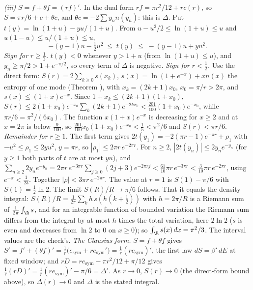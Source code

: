 \emph{(iii)} $S = f + \theta f = (rf)'$. In the dual form $rf = \pi r^{2}/12 + rc(r)$, so $S = \pi r/6 + c + \theta c$, and $\theta c = -2\sum y_{n}n(y_{n})$: this is $\Delta$. Put $t(y) = \ln(1 + u) - yu/(1 + u)$. From $u - u^{2}/2 \le \ln(1 + u) \le u$ and $u(1 - u) \le u/(1 + u) \le u$,
\[
-(y - 1)u - \tfrac12u^{2} \;\le\; t(y) \;\le\; -(y - 1)u + yu^{2} .
\]
\emph{Sign for $r \ge \tfrac12$.} $t(y) < 0$ whenever $y > 1 + u$ (from $\ln(1 + u) \le u$), and $y_{n} \ge \pi/2 > 1 + e^{-\pi/2}$, so every term of $\Delta$ is negative. \emph{Sign for $r < \tfrac12$.} Use the direct form: $S(r) = 2\sum_{k \ge 0}s(x_{k})$, $s(x) = \ln(1 + e^{-x}) + xn(x)$ the entropy of one mode (Theorem ), with $x_{k} = (2k + 1)x_{0}$, $x_{0} = \pi/r > 2\pi$, and $s(x) \le (1 + x)e^{-x}$. Since $1 + x_{k} \le (2k + 1)(1 + x_{0})$, $S(r) \le 2(1 + x_{0})e^{-x_{0}}\sum_{k}(2k + 1)e^{-2kx_{0}} < \tfrac{201}{100}(1 + x_{0})e^{-x_{0}}$, while $\pi r/6 = \pi^{2}/(6x_{0})$. The function $x(1 + x)e^{-x}$ is decreasing for $x \ge 2$ and at $x = 2\pi$ is below $\tfrac{9}{100}$, so $\tfrac{201}{100}x_{0}(1 + x_{0})e^{-x_{0}} < \tfrac15 < \pi^{2}/6$ and $S(r) < \pi r/6$. \emph{Remainder for $r \ge 1$.} The first term gives $2t(y_{1}) = -2(\pi r - 1)e^{-\pi r} + \rho_{1}$ with $-u^{2} \le \rho_{1} \le 2yu^{2}$, $y = \pi r$, so $|\rho_{1}| \le 2\pi r\,e^{-2\pi r}$. For $n \ge 2$, $|2t(y_{n})| \le 2y_{n}e^{-y_{n}}$ (for $y \ge 1$ both parts of $t$ are at most $yu$), and $\sum_{n \ge 2}2y_{n}e^{-y_{n}} = 2\pi r\,e^{-3\pi r}\sum_{j \ge 0}(2j + 3)e^{-2\pi rj} < \tfrac{61}{10}\pi r\,e^{-3\pi r} < \tfrac{3}{10}\pi r\,e^{-2\pi r}$, using $e^{-\pi} < \tfrac{1}{23}$. Together $|\rho| < 3\pi r\,e^{-2\pi r}$. The value at $r = 1$ is $S(1) - \pi/6$ with $S(1) = \tfrac12\ln 2$. The limit $S(R)/R \to \pi/6$ follows. That it equals the density integral: $S(R)/R = \tfrac{1}{2\pi}\sum_{k}h\,s(h(k + \tfrac12))$ with $h = 2\pi/R$ is a Riemann sum of $\tfrac{1}{2\pi}\int_{\R}s$, and for an integrable function of bounded variation the Riemann sum differs from the integral by at most $h$ times the total variation, here $2\ln 2$ ($s$ is even and decreases from $\ln 2$ to $0$ on $x \ge 0$); so $\int_{\R}s(x)\,dx = \pi^{2}/3$. The interval values are the check's. \emph{The Clausius form.} $S = f + \theta f$ gives $S' = f' + (\theta f)' = \tfrac1r\bigl(e_{\mathrm{sym}} + re_{\mathrm{sym}}'\bigr) = \tfrac1r(re_{\mathrm{sym}})'$, the first law $dS = \beta'\,dE$ at fixed window; and $rD = re_{\mathrm{sym}} - \pi r^{2}/12 + \pi/12$ gives $\tfrac1r(rD)' = \tfrac1r(re_{\mathrm{sym}})' - \pi/6 = \Delta'$. As $r \to 0$, $S(r) \to 0$ (the direct-form bound above), so $\Delta(r) \to 0$ and $\Delta$ is the stated integral.

